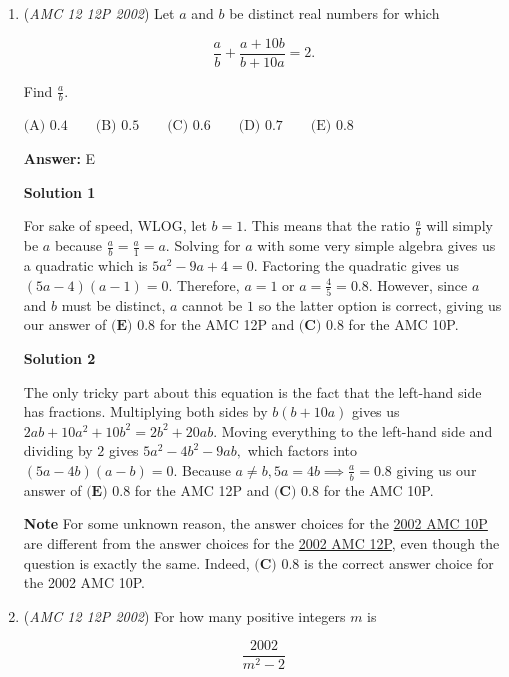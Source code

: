 \begin{enumerate}
 


	\item (\textit{AMC 12 12P 2002}) Let $a$ and $b$ be distinct real numbers for which

 \[\frac{a}{b} + \frac{a+10b}{b+10a} = 2.\]


 Find $\frac{a}{b}$.


 $\text{(A) }0.4 \qquad \text{(B) }0.5  \qquad \text{(C) }0.6 \qquad \text{(D) }0.7 \qquad \text{(E) }0.8$

 \textbf{Answer: }E



\textbf{Solution 1}

For sake of speed, WLOG, let $b=1$. This means that the ratio $\frac{a}{b}$ will simply be $a$ because $\frac{a}{b}=\frac{a}{1}=a.$ Solving for $a$ with some very simple algebra gives us a quadratic which is $5a^2 -9a +4=0.$ Factoring the quadratic gives us $(5a-4)(a-1)=0$. Therefore, $a=1$ or $a=\frac{4}{5}=0.8.$ However, since $a$ and $b$ must be distinct, $a$ cannot be $1$ so the latter option is correct, giving us our answer of $\boxed{\textbf{(E) } 0.8}$ for the AMC 12P and $\boxed{\textbf{(C) } 0.8}$ for the AMC 10P.

 



\textbf{Solution 2}

The only tricky part about this equation is the fact that the left-hand side has fractions. Multiplying both sides by $b(b+10a)$ gives us $2ab+10a^2+10b^2=2b^2+20ab.$ Moving everything to the left-hand side and dividing by $2$ gives $5a^2-4b^2 -9ab,$ which factors into $(5a-4b)(a-b)=0.$ Because $a \neq b, 5a=4b \implies \frac{a}{b}=0.8$ giving us our answer of $\boxed{\textbf{(E) } 0.8}$ for the AMC 12P and $\boxed{\textbf{(C) } 0.8}$ for the AMC 10P.

 \textbf{Note} For some unknown reason, the answer choices for the \href{https://artofproblemsolving.com/wiki/index.php?title=2002\_AMC\_10P}{2002 AMC 10P} are different from the answer choices for the \href{https://artofproblemsolving.com/wiki/index.php?title=2002\_AMC\_12P}{2002 AMC 12P}, even though the question is exactly the same. Indeed, $\boxed{\textbf{(C) }0.8}$ is the correct answer choice for the 2002 AMC 10P.

 


	\item (\textit{AMC 12 12P 2002}) For how many positive integers $m$ is 

 \[\frac{2002}{m^2 -2}\]



\end{enumerate}
